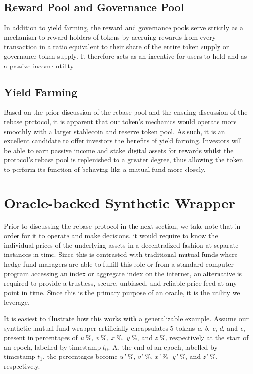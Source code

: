 \documentclass[12pt]{article}
\begin{document}
    \subsection{Reward Pool and Governance Pool}

    In addition to yield farming, the reward and governance pools serve strictly as a mechanism to reward holders of tokens by accruing rewards from every transaction in a ratio equivalent to their share of the entire token supply or governance token supply. It therefore acts as an incentive for users to hold and as a passive income utility.
    
    \subsection{Yield Farming}

    Based on the prior discussion of the rebase pool and the ensuing discussion of the rebase protocol, it is apparent that our token's mechanics would operate more smoothly with a larger stablecoin and reserve token pool. As such, it is an excellent candidate to offer investors the benefits of yield farming. Investors will be able to earn passive income and stake digital assets for rewards whilst the protocol's rebase pool is replenished to a greater degree, thus allowing the token to perform its function of behaving like a mutual fund more closely.  

\section{Oracle-backed Synthetic Wrapper}

    Prior to discussing the rebase protocol in the next section, we take note that in order for it to operate and make decisions, it would require to know the individual prices of the underlying assets in a decentralized fashion at separate instances in time. Since this is contrasted with traditional mutual funds where hedge fund managers are able to fulfill this role or from a standard computer program accessing an index or aggregate index on the internet, an alternative is required to provide a trustless, secure, unbiased, and reliable price feed at any point in time. Since this is the primary purpose of an oracle, it is the utility we leverage.  \par
    
    \vspace{0.15cm}
    It is easiest to illustrate how this works with a generalizable example. Assume our synthetic mutual fund wrapper artificially encapsulates 5 tokens \emph{a}, \emph{b}, \emph{c}, \emph{d}, and \emph{e}, present in percentages of \emph{u} \%, \emph{v} \%, \emph{x} \%, \emph{y} \%, and \emph{z} \%, respectively at the start of an epoch, labelled by timestamp \emph{$t_0$}. At the end of an epoch, labelled by timestamp \emph{$t_1$}, the percentages become \emph{u'} \%, \emph{v'} \%, \emph{x'} \%, \emph{y'} \%, and \emph{z'} \%, respectively. \par
    
\end{document}
